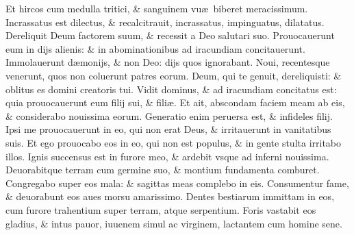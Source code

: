\documentclass[a5paper,10pt]{book}
\def\ae{æ}
\begin{document}
\begin{multicols*}{2}
\newline \color{red} E\color{black}t hircos cum medulla tritici, \& sanguinem vu\ae \ biberet meracissimum.
\newline \color{red} I\color{black}ncrassatus est dilectus, \& recalcitrauit, incrassatus, impinguatus, dilatatus.
\newline \color{red} D\color{black}ereliquit Deum factorem suum, \& recessit a Deo salutari suo.
\newline \color{red} P\color{black}rouocauerunt eum in dijs alienis: \& in abominationibus ad iracundiam concitauerunt.
\newline \color{red} I\color{black}mmolauerunt d\ae monijs, \& non Deo: dijs quos ignorabant.
\newline \color{red} N\color{black}oui, recentesque venerunt, quos non coluerunt patres eorum.
\newline \color{red} D\color{black}eum, qui te genuit, dereliquisti: \& oblitus es domini creatoris tui.
\newline \color{red} V\color{black}idit dominus, \& ad iracundiam concitatus est: quia prouocauerunt eum filij sui, \& fili\ae .
\newline \color{red} E\color{black}t ait, abscondam faciem meam ab eis, \& considerabo nouissima eorum.
\newline \color{red} G\color{black}eneratio enim peruersa est, \& infideles filij.
\newline \color{red} I\color{black}psi me prouocauerunt in eo, qui non erat Deus, \& irritauerunt in vanitatibus suis.
\newline \color{red} E\color{black}t ego prouocabo eos in eo, qui non est populus, \& in gente stulta irritabo illos.
\newline \color{red} I\color{black}gnis succensus est in furore meo, \& ardebit vsque ad inferni nouissima.
\newline \color{red} D\color{black}euorabitque terram cum germine suo, \& montium fundamenta comburet.
\newline \color{red} C\color{black}ongregabo super eos mala: \& sagittas meas complebo in eis.
\newline \color{red} C\color{black}onsumentur fame, \& deuorabunt eos aues morsu amarissimo.
\newline \color{red} D\color{black}entes bestiarum immittam in eos, cum furore trahentium super terram, atque serpentium.
\newline \color{red} F\color{black}oris vastabit eos gladius, \& intus pauor, iuuenem simul ac virginem, lactantem cum homine sene.

\end{multicols*}
\end{document}
